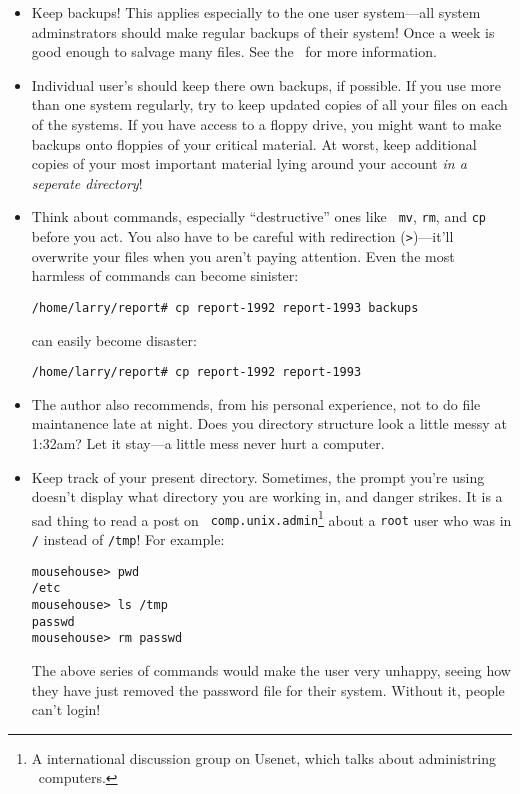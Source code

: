 \begin{itemize}
\item Keep backups!  This applies especially to the one user
  system---all system adminstrators should make regular backups of
  their system!  Once a week is good enough to salvage many files.
  See the \ldpsa\ for more information.
\item Individual user's should keep there own backups, if possible.
  If you use more than one system regularly, try to keep updated
  copies of all your files on each of the systems.  If you have access
  to a floppy drive, you might want to make backups onto floppies of
  your critical material.  At worst, keep additional copies of your
  most important material lying around your account {\em in a seperate
    directory\/}!
\item Think about commands, especially ``destructive'' ones like {\tt
    mv}, {\tt rm}, and {\tt cp} before you act.  You also have to be
  careful with redirection ({\tt >})---it'll overwrite your files when
  you aren't paying attention. Even the most harmless of commands can
  become sinister:
\begin{screen}\begin{verbatim}
/home/larry/report# cp report-1992 report-1993 backups
\end{verbatim}\end{screen}
can easily become disaster:
\begin{screen}\begin{verbatim}
/home/larry/report# cp report-1992 report-1993
\end{verbatim}\end{screen}
\item The author also recommends, from his personal experience, not to
  do file maintanence late at night.  Does you directory structure
  look a little messy at 1:32am?  Let it stay---a little mess never
  hurt a computer.
\item Keep track of your present directory.  Sometimes, the prompt
  you're using doesn't display what directory you are working in, and
  danger strikes.  It is a sad thing to read a post on {\tt
    comp.unix.admin}\footnote{A international discussion group on
    Usenet, which talks about administring \unix\ computers.} about a
  {\tt root} user who was in {\tt /} instead of {\tt /tmp}!  For
  example:
  \begin{screen}\begin{verbatim}
mousehouse> pwd
/etc
mousehouse> ls /tmp
passwd
mousehouse> rm passwd
\end{verbatim}\end{screen}

The above series of commands would make the user very unhappy, seeing
how they have just removed the password file for their system. Without
it, people can't login!
\end{itemize}

